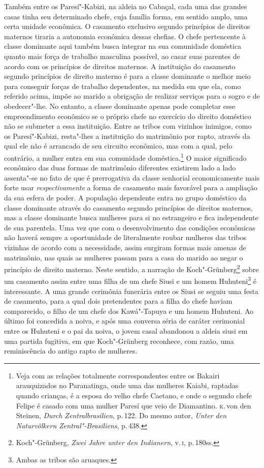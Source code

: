 Também entre os Paresí"-Kabizi, na
aldeia no Cabaçal, cada uma das grandes casas tinha seu determinado
chefe, cuja família forma, em sentido amplo, uma certa unidade
econômica. O casamento exclusivo segundo princípios de direitos maternos
tiraria a autonomia econômica dessas chefias. O chefe pertencente à
classe dominante aqui também busca integrar na sua comunidade doméstica
quanto mais força de trabalho masculina possível, ao casar suas
parentes de acordo com os princípios de direitos maternos. A
instituição do casamento segundo princípios de direito materno é para a
classe dominante o melhor meio para conseguir forças de trabalho
dependentes, na medida em que ela, como referido acima, impõe ao marido
a obrigação de realizar serviços para o sogro e de obedecer"-lhe. No entanto, 
a classe dominante apenas pode completar esse empreendimento
econômico se o próprio chefe no exercício do direito doméstico não se
submeter a essa instituição. Entre as tribos com vizinhos inimigos, como
os Paresí"-Kabizi, resta"-lhes a instituição do matrimônio por rapto,
através da qual ele não é arrancado de seu circuito econômico, mas com a
qual, pelo contrário, a mulher entra em sua comunidade
doméstica.\footnote{Veja com as relações totalmente correspondentes entre
  os Bakairi arauquizados no Paranatinga, onde uma das mulheres Kaiabi,
  raptadas quando crianças, é a esposa do velho chefe Caetano, e onde o
  segundo chefe Felipe é casado com uma mulher Paresí que veio de
  Diamantino. \textsc{k}.\,von den Steinen, \textit{Durch Zentralbrasilien}, p.\,122.
  Do mesmo autor, \textit{Unter den Naturvölkern Zentral"-Brasiliens}, p.\,438.} 
  O maior significado econômico das duas formas de matrimônio
diferentes existirem lado a lado assenta"-se no fato de que é prerrogativa da
classe senhorial economicamente mais forte usar \textit{respectivamente} a forma
de casamento mais favorável para a ampliação da sua esfera de poder. A
população dependente entra no grupo doméstico da classe dominante
através do casamento segundo princípios de direitos maternos, mas a
classe dominante busca mulheres para si no estrangeiro e fica
independente de sua parentela. Uma vez que com o desenvolvimento das
condições econômicas não haverá sempre a oportunidade de
literalmente roubar mulheres das tribos vizinhas de acordo com a
necessidade, assim surgiram formas mais amenas de matrimônio, nas
quais as mulheres passam para a casa do marido ao negar o princípio de
direito materno. Neste sentido, a narração de Koch"-Grünberg\footnote{Koch"-Grünberg,
  \textit{Zwei Jahre unter den Indianern}, v.\,\textsc{i}, p.\,180ss.}
sobre um casamento assim entre uma filha de um chefe Siusi e um homem
Huhuteni\footnote{Ambas as tribos são aruaques.} é interessante. A uma grande cerimônia
funerária entre os Siusi se seguiu uma festa de casamento, para a qual
dois pretendentes para a filha do chefe haviam comparecido, o filho de
um chefe dos Kawá"-Tapuya e um homem Huhuteni. Ao último foi concedida a
noiva, e após uma conversa séria de caráter cerimonial entre os Huhuteni
e o pai da noiva, o jovem casal abandonou a aldeia siusi em uma partida
fugitiva, em que Koch"-Grünberg reconhece, com razão, uma reminiscência
do antigo rapto de mulheres.

